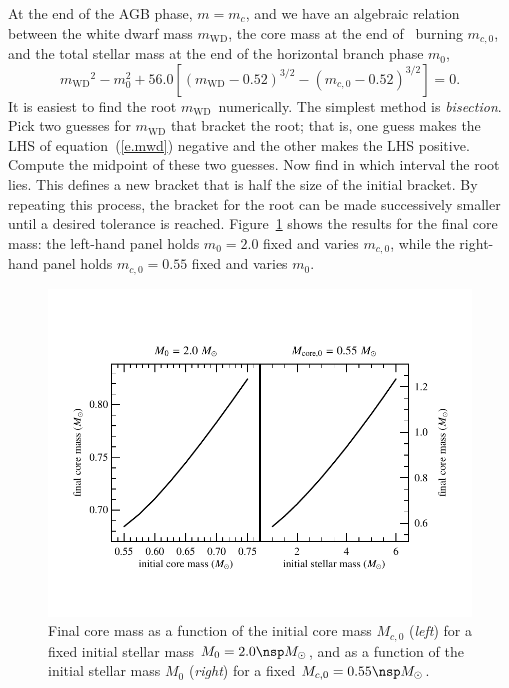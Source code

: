 \documentclass[11pt]{article}
\newcommand{\mwd}{\ensuremath{m_{\mathrm{WD}}}}
\begin{document}
At the end of the AGB phase, $m = m_{c}$, and we have an algebraic relation between the white dwarf mass $\mwd$, the core mass at the end of \helium\ burning $m_{c,0}$, and the total stellar mass at the end of the horizontal branch phase $m_{0}$,
\begin{equation}\label{e.mwd}
\mwd^{2} - m_{0}^{2} + 56.0\left[\left(\mwd-0.52\right)^{3/2} - \left(m_{c,0}-0.52\right)^{3/2}\right] = 0.
\end{equation}
It is easiest to find the root \mwd\ numerically. The simplest method is \emph{bisection}.  Pick two guesses for $\mwd$ that bracket the root; that is, one guess makes the LHS of equation~(\ref{e.mwd}) negative and the other makes the LHS positive.  Compute the midpoint of these two guesses.  Now find in which interval the root lies.  This defines a new bracket that is half the size of the initial bracket. By repeating this process, the bracket for the root can be made successively smaller until a desired tolerance is reached.  Figure~\ref{f.core-mass} shows the results for the final core mass: the left-hand panel holds $m_{0} = 2.0$ fixed and varies $m_{c,0}$, while the right-hand panel holds $m_{c,0} = 0.55$ fixed and varies $m_{0}$.

\begin{figure}[htbp]
\includegraphics[width=5in]{plots_out/core_mass_combined}
\caption{Final core mass as a function of the initial core mass $M_{c,0}$ (\emph{left}) for  a fixed initial stellar mass $M_{0} = 2.0\nsp\Msun$, and as a function of the initial stellar mass $M_{0}$ (\emph{right}) for a fixed $M_{c,0}=0.55\nsp\Msun$.\label{f.core-mass}}
\end{figure}
\clearpage
\end{document}
